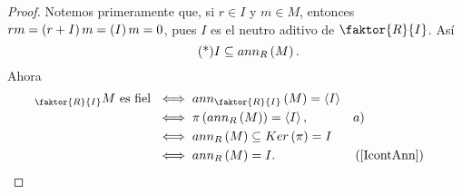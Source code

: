 \documentclass{article}
\begin{document}
\begin{enumerate}[label=\textbf{Ej \arabic*.}]
\begin{proof}
		 Notemos primeramente que, si $r\in I$ y $m\in M$, entonces $rm=\left(r+I\right)m=\left(I\right)m=0$, pues $I$ es el neutro aditivo de $\faktor{R}{I}$. Así \begin{equation*}\tag{*}\label{IcontAnn}
			I\subseteq ann_R\left(M\right).
		\end{equation*}
		Ahora
		\begin{align*}
			\ringmod{\faktor{R}{I}}{M}{l}\text{ es fiel }&\iff ann_{\faktor{R}{I}}\lrprth{M}=\gengroup{I}\\
			&\iff \pi\lrprth{ann_R\lrprth{M}}=\gengroup{I}, && a)\\
			&\iff ann_R\lrprth{M}\subseteq Ker\lrprth{\pi}=I\\
			&\iff ann_R\lrprth{M}=I. && \lrprth{\text{\ref{IcontAnn}}}
		\end{align*}
	\end{proof}
	

\end{enumerate}
\end{document}
